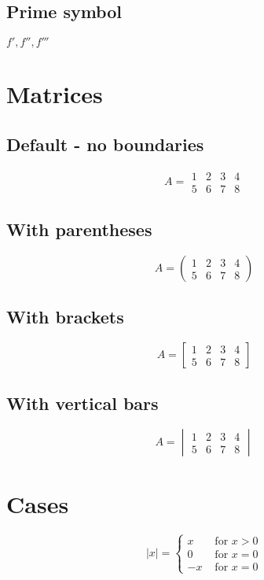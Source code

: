 \documentclass{article}
\theoremstyle{definition}
\theoremstyle{remark}
\begin{document}
  \subsection{Prime symbol}
  $f', f'', f'''$

\section{Matrices}
  \subsection{Default - no boundaries}
  \[
    A =
    \begin{matrix}
      1 & 2 & 3 & 4  \\
      5 & 6 & 7 & 8
    \end{matrix}
  \]

  \subsection{With parentheses}
  \[
    A =
    \begin{pmatrix}
      1 & 2 & 3 & 4  \\
      5 & 6 & 7 & 8
    \end{pmatrix}
  \]

  \subsection{With brackets}
  \[
    A =
    \begin{bmatrix}
      1 & 2 & 3 & 4  \\
      5 & 6 & 7 & 8
    \end{bmatrix}
  \]

  \subsection{With vertical bars}
  \[
    A =
    \begin{vmatrix}
      1 & 2 & 3 & 4  \\
      5 & 6 & 7 & 8
    \end{vmatrix}
  \]

\section{Cases}
    \[
      |x| =
      \begin{cases}
        x & \text{ for } x > 0 \\
        0 & \text{ for } x = 0 \\
        -x & \text{ for } x = 0
      \end{cases}
    \]
\end{document}
